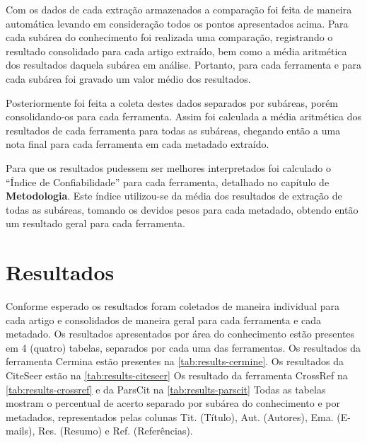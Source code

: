 Com os dados de cada extração armazenados a comparação foi feita de maneira automática levando em consideração todos os pontos apresentados acima. Para cada subárea do conhecimento foi realizada uma comparação, registrando o resultado consolidado para cada artigo extraído, bem como a média aritmética dos resultados daquela subárea em análise. Portanto, para cada ferramenta e para cada subárea foi gravado um valor médio dos resultados.

Posteriormente foi feita a coleta destes dados separados por subáreas, porém consolidando-os para cada ferramenta. Assim foi calculada a média aritmética dos resultados de cada ferramenta para todas as subáreas, chegando então a uma nota final para cada ferramenta em cada metadado extraído.


Para que os resultados pudessem ser melhores interpretados foi calculado o ``Índice de Confiabilidade'' para cada ferramenta, detalhado no capítulo de \textbf{Metodologia}. Este índice utilizou-se da média dos resultados de extração de todas as subáreas, tomando os devidos pesos para cada metadado, obtendo então um resultado geral para cada ferramenta.


\section{Resultados}
\label{sec:results}


Conforme esperado os resultados foram coletados de maneira individual para cada artigo e consolidados de maneira geral para cada ferramenta e cada metadado. Os resultados apresentados por área do conhecimento estão presentes em 4 (quatro) tabelas, separados por cada uma das ferramentas. Os resultados da ferramenta Cermina estão presentes na \autoref{tab:results-cermine}. Os resultados da CiteSeer estão na \autoref{tab:results-citeseer} Os resultado da ferramenta CrossRef na \autoref{tab:results-crossref} e da ParsCit na \autoref{tab:results-parscit} Todas as tabelas mostram o percentual de acerto separado por subárea do conhecimento e por metadados, representados pelas colunas Tit. (Título),  Aut. (Autores), Ema. (E-mails), Res. (Resumo) e Ref. (Referências).

